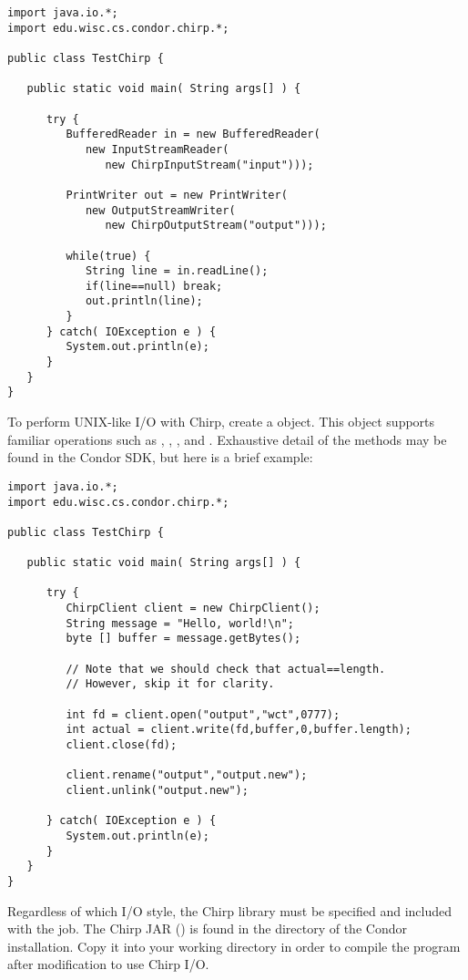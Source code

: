 \begin{verbatim}
import java.io.*;
import edu.wisc.cs.condor.chirp.*;

public class TestChirp {

   public static void main( String args[] ) {

      try {
         BufferedReader in = new BufferedReader(
            new InputStreamReader(
               new ChirpInputStream("input")));

         PrintWriter out = new PrintWriter(
            new OutputStreamWriter(
               new ChirpOutputStream("output")));

         while(true) {
            String line = in.readLine();
            if(line==null) break;
            out.println(line);
         }
      } catch( IOException e ) {
         System.out.println(e);
      }
   }
}
\end{verbatim}

To perform UNIX-like I/O with Chirp,
create a  object.
This object supports familiar operations such as , ,
, and .
Exhaustive detail of the methods may be found in the Condor 
SDK, but here is a brief example:

\begin{verbatim}
import java.io.*;
import edu.wisc.cs.condor.chirp.*;

public class TestChirp {

   public static void main( String args[] ) {

      try {
         ChirpClient client = new ChirpClient();
         String message = "Hello, world!\n";
         byte [] buffer = message.getBytes();

         // Note that we should check that actual==length.
         // However, skip it for clarity.

         int fd = client.open("output","wct",0777);
         int actual = client.write(fd,buffer,0,buffer.length);
         client.close(fd);

         client.rename("output","output.new");
         client.unlink("output.new");

      } catch( IOException e ) {
         System.out.println(e);
      }
   }
}
\end{verbatim}

Regardless of which I/O style, 
the Chirp library must be specified and included with the job.
The Chirp JAR ()
is found in the  directory of the Condor installation.
Copy it into your working directory in order to
compile the program after modification to use Chirp I/O.

